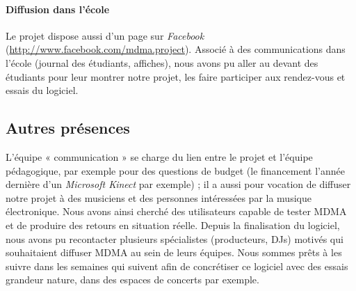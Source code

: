 \paragraph{Diffusion dans l'école}
\par Le projet dispose aussi d'un page sur \emph{Facebook} (\url{http://www.facebook.com/mdma.project}). Associé à des communications dans l'école (journal des étudiants, affiches), nous avons pu aller au devant des étudiants pour leur montrer notre projet, les faire participer aux rendez-vous et essais du logiciel.
\subsection{Autres présences}
\par L'équipe « communication » se charge du lien entre le projet et l'équipe pédagogique, par exemple pour des questions de budget (le financement l'année dernière d'un \emph{Microsoft Kinect} par exemple) ; il a aussi pour vocation de diffuser notre projet à des musiciens et des personnes intéressées par la musique électronique. Nous avons ainsi cherché des utilisateurs capable de tester MDMA et de produire des retours en situation réelle. Depuis la finalisation du logiciel, nous avons pu recontacter plusieurs spécialistes (producteurs, DJs) motivés qui souhaitaient diffuser MDMA au sein de leurs équipes. Nous sommes prêts à les suivre dans les semaines qui suivent afin de concrétiser ce logiciel avec des essais grandeur nature, dans des espaces de concerts par exemple.
